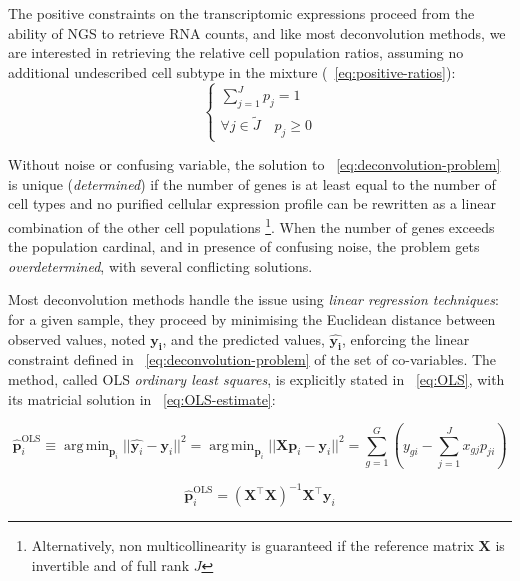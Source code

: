 \documentclass[long, final]{jobim}
\DeclareMathOperator*{\argmin}{arg\,min}
\begin{document}
The positive constraints on the transcriptomic expressions proceed from the ability of NGS to retrieve RNA counts, and like most deconvolution methods, we are interested in retrieving the relative cell population ratios, assuming no additional undescribed cell subtype in the mixture (\equationname ~\ref{eq:positive-ratios}):
\begin{equation}
\label{eq:positive-ratios}
\begin{cases}
\sum_{j=1}^J p_{j}=1\\
\forall j \in \widetilde{J} \quad p_j\ge 0
\end{cases}
\end{equation}


Without noise or confusing variable, the solution to \equationname ~\ref{eq:deconvolution-problem} is unique (\textit{determined}) if the number of genes is at least equal to the number of cell types and no purified cellular expression profile can be rewritten as a linear combination of the other cell populations \footnote{Alternatively, non multicollinearity is guaranteed if the reference matrix \(\boldsymbol{X}\) is invertible and of full rank \(J\)}. When the number of genes exceeds the population cardinal, and in presence of confusing noise, the problem gets \textit{overdetermined}, with several conflicting solutions.

Most deconvolution methods handle the issue using \textit{linear regression techniques}: for a given sample, they proceed by minimising the Euclidean distance between observed values, noted \(\boldsymbol{y_i}\), and the predicted values, \(\boldsymbol{\hat{y_i}} \), enforcing the linear constraint defined in \equationname ~\ref{eq:deconvolution-problem} of the set of co-variables. The method, called OLS \textit{ordinary least squares}, is explicitly stated in \equationname ~\ref{eq:OLS}, with its matricial solution in \equationname ~\ref{eq:OLS-estimate}:

\begin{equation}
 \label{eq:OLS}
 \boldsymbol{\hat{p}}_{i}^{\text{OLS}} \equiv \argmin_{\boldsymbol{p}_i} ||\hat{\boldsymbol{y}_i} - \boldsymbol{y}_i||^2 = \argmin_{\boldsymbol{p}_i}  ||\boldsymbol{X}\boldsymbol{p}_i - \boldsymbol{y}_i||^2 = \sum_{g=1}^G \left( y_{gi} - \sum_{j=1}^J  x_{gj} p_{ji}\right)
\end{equation}

\begin{equation}
    \label{eq:OLS-estimate}
    \boldsymbol{\hat{p}}_{i}^{\text{OLS}} = (\boldsymbol{X}^\top\boldsymbol{X})^{-1}\boldsymbol{X}^\top \boldsymbol{y}_i
\end{equation}
\end{document}
